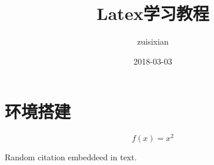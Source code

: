 \documentclass{article}
\title{Latex学习教程}
\date{2018-03-03}
\author{zuisixian}
\begin{document}
\maketitle
\section{环境搭建}
  \begin{equation}
    f(x) = x^2
  \end{equation}
  
    Random citation \cite{DUMMY:1} embeddeed in text.
  
  
   
  
\end{document}
